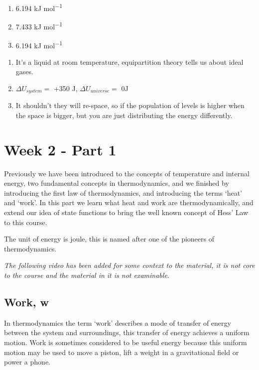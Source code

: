 \documentclass[
]{book}
\providecommand{\tightlist}{%
  \setlength{\itemsep}{0pt}\setlength{\parskip}{0pt}}
\begin{document}
\begin{enumerate}
\def\labelenumi{\alph{enumi}.}
\tightlist
\item
  6.194 kJ mol\textsuperscript{−1}
\item
  7.433 kJ mol\textsuperscript{−1}
\item
  6.194 kJ mol\textsuperscript{−1}
\end{enumerate}

\begin{enumerate}
\def\labelenumi{\arabic{enumi}.}
\setcounter{enumi}{1}
\item
  It's a liquid at room temperature, equipartition theory tells us about ideal gases.
\item
  \(\Delta U_{system}=\) +350 J, \(\Delta U_{universe}=\) 0J
\item
  It shouldn't they will re-space, so if the population of levels is higher when the space is bigger, but you are just distributing the energy differently.
\end{enumerate}

\hypertarget{ch:Part3}{%
\chapter{Week 2 - Part 1}\label{ch:Part3}}

Previously we have been introduced to the concepts of temperature and internal energy, two fundamental concepts in thermodynamics, and we finished by introducing the first law of thermodynamics, and introducing the terms `heat' and `work'. In this part we learn what heat and work are thermodynamically, and extend our idea of state functions to bring the well known concept of Hess' Law to this course.

The unit of energy is joule, this is named after one of the pioneers of thermodynamics.

\emph{The following video has been added for some context to the material, it is not core to the course and the material in it is not examinable.}

\hypertarget{sec:work}{%
\section{Work, w}\label{sec:work}}

In thermodynamics the term `work' describes a mode of transfer of energy between the system and surroundings, this transfer of energy achieves a uniform motion. Work is sometimes considered to be useful energy because this uniform motion may be used to move a piston, lift a weight in a gravitational field or power a phone.
\end{document}
